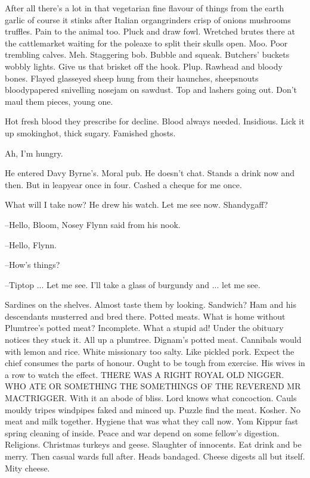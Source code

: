 After all there's a lot in that vegetarian fine flavour of things from the
earth garlic of course it stinks after Italian organgrinders crisp of
onions mushrooms truffles. Pain to the animal too. Pluck and draw fowl.
Wretched brutes there at the cattlemarket waiting for the poleaxe to split
their skulls open. Moo. Poor trembling calves. Meh. Staggering bob. Bubble
and squeak. Butchers' buckets wobbly lights. Give us that brisket off the
hook. Plup. Rawhead and bloody bones. Flayed glasseyed sheep hung from
their haunches, sheepsnouts bloodypapered snivelling nosejam on sawdust.
Top and lashers going out. Don't maul them pieces, young one.

Hot fresh blood they prescribe for decline. Blood always needed.
Insidious. Lick it up smokinghot, thick sugary. Famished ghosts.

Ah, I'm hungry.

He entered Davy Byrne's. Moral pub. He doesn't chat. Stands a
drink now and then. But in leapyear once in four. Cashed a cheque for me
once.

What will I take now? He drew his watch. Let me see now. Shandygaff?

--Hello, Bloom, Nosey Flynn said from his nook.

--Hello, Flynn.

--How's things?

--Tiptop ... Let me see. I'll take a glass of burgundy and ... let
me see.

Sardines on the shelves. Almost taste them by looking. Sandwich?
Ham and his descendants musterred and bred there. Potted meats. What is
home without Plumtree's potted meat? Incomplete. What a stupid ad!
Under the obituary notices they stuck it. All up a plumtree. Dignam's
potted meat. Cannibals would with lemon and rice. White missionary too
salty. Like pickled pork. Expect the chief consumes the parts of honour.
Ought to be tough from exercise. His wives in a row to watch the effect.
THERE WAS A RIGHT ROYAL OLD NIGGER. WHO ATE OR SOMETHING THE SOMETHINGS OF
THE REVEREND MR MACTRIGGER. With it an abode of bliss. Lord knows what
concoction. Cauls mouldy tripes windpipes faked and minced up. Puzzle
find the meat. Kosher. No meat and milk together. Hygiene that was what
they call now. Yom Kippur fast spring cleaning of inside. Peace and war
depend on some fellow's digestion. Religions. Christmas turkeys and geese.
Slaughter of innocents. Eat drink and be merry. Then casual wards full
after. Heads bandaged. Cheese digests all but itself. Mity cheese.

